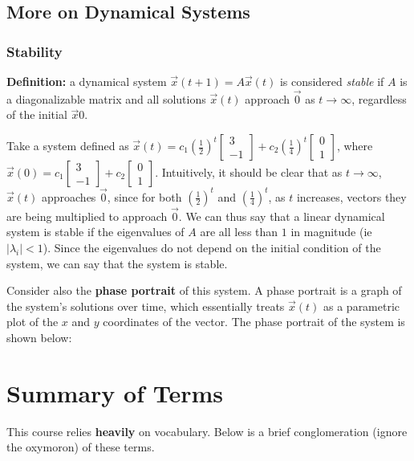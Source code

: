 \documentclass[12pt]{article}
\begin{document}
{\subsection{More on Dynamical Systems}

\subsubsection{Stability}

\textbf{Definition: } a dynamical system $\vec{x}(t+1) = A\vec{x}(t)$ is considered \textit{stable} if $A$ is a diagonalizable matrix and all solutions $\vec{x}(t)$ approach $\vec{0}$ as $t \to \infty$, regardless of the initial $\vec{x}{0}$. 

Take a system defined as $\vec{x}(t) = c_1 (\frac{1}{2})^t \begin{bmatrix}
    3\\
    -1
\end{bmatrix} + c_2 (\frac{1}{4})^t \begin{bmatrix}
    0\\
    1
\end{bmatrix}$, where $\vec{x}(0) = c_1\begin{bmatrix}
    3\\
    -1
\end{bmatrix} + c_2\begin{bmatrix}
    0\\
    1
\end{bmatrix}$. Intuitively, it should be clear that as $t \to \infty$, $\vec{x}(t)$ approaches $\vec{0}$, since for both $(\frac{1}{2})^t$ and $(\frac{1}{4})^t$, as $t$ increases, vectors they are being multiplied to approach $\vec{0}$. We can thus say that a linear dynamical system is stable if the eigenvalues of $A$ are all less than $1$ in magnitude (ie $|\lambda_i| < 1$). Since the eigenvalues do not depend on the initial condition of the system, we can say that the system is stable.

Consider also the \textbf{phase portrait} of this system. A phase portrait is a graph of the system's solutions over time, which essentially treats $\vec{x}(t)$ as a parametric plot of the $x$ and $y$ coordinates of the vector. The phase portrait of the system is shown below:

\newpage
\section{Summary of Terms}

This course relies \textbf{heavily} on vocabulary. Below is a brief conglomeration (ignore the oxymoron) of these terms.

}
\end{document}

